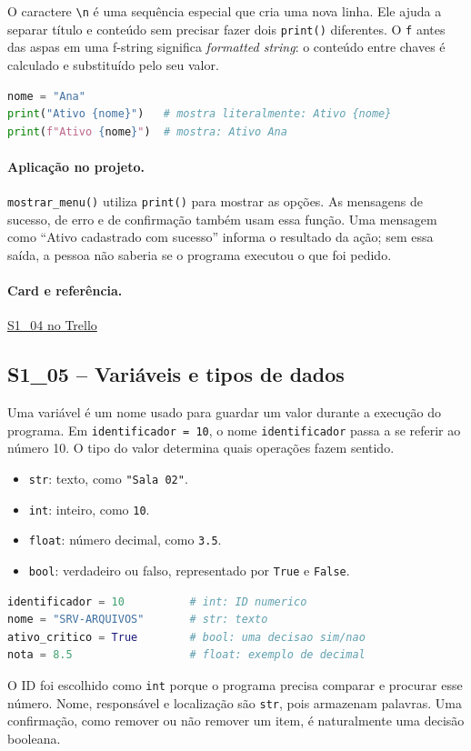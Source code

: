 \documentclass[11pt,a4paper]{article}
\newcommand{\projeto}{\paragraph{Aplicação no projeto.}}
\newcommand{\referencia}[2]{\paragraph{Card e referência.}\href{#1}{#2}}
\newcommand{\cardsection}[1]{\Needspace{12\baselineskip}\subsection{#1}}
\begin{document}
O caractere \texttt{\textbackslash n} é uma sequência especial que cria uma nova linha. Ele ajuda a separar título e conteúdo sem precisar fazer dois \texttt{print()} diferentes. O \texttt{f} antes das aspas em uma f-string significa \emph{formatted string}: o conteúdo entre chaves é calculado e substituído pelo seu valor.

\begin{lstlisting}[language=Python,caption={Diferença entre string comum e f-string}]
nome = "Ana"
print("Ativo {nome}")   # mostra literalmente: Ativo {nome}
print(f"Ativo {nome}")  # mostra: Ativo Ana
\end{lstlisting}

\projeto
\texttt{mostrar\_menu()} utiliza \texttt{print()} para mostrar as opções. As mensagens de sucesso, de erro e de confirmação também usam essa função. Uma mensagem como ``Ativo cadastrado com sucesso'' informa o resultado da ação; sem essa saída, a pessoa não saberia se o programa executou o que foi pedido.

\referencia{https://trello.com/c/YeugQuYt}{S1\_04 no Trello}

\cardsection{S1\_05 -- Variáveis e tipos de dados}

Uma variável é um nome usado para guardar um valor durante a execução do programa. Em \texttt{identificador = 10}, o nome \texttt{identificador} passa a se referir ao número 10. O tipo do valor determina quais operações fazem sentido.

\begin{itemize}
  \item \texttt{str}: texto, como \texttt{"Sala 02"}.
  \item \texttt{int}: inteiro, como \texttt{10}.
  \item \texttt{float}: número decimal, como \texttt{3.5}.
  \item \texttt{bool}: verdadeiro ou falso, representado por \texttt{True} e \texttt{False}.
\end{itemize}

\begin{lstlisting}[language=Python,caption={Tipos de dados no contexto do projeto}]
identificador = 10          # int: ID numerico
nome = "SRV-ARQUIVOS"       # str: texto
ativo_critico = True        # bool: uma decisao sim/nao
nota = 8.5                  # float: exemplo de decimal
\end{lstlisting}

O ID foi escolhido como \texttt{int} porque o programa precisa comparar e procurar esse número. Nome, responsável e localização são \texttt{str}, pois armazenam palavras. Uma confirmação, como remover ou não remover um item, é naturalmente uma decisão booleana.
\end{document}
